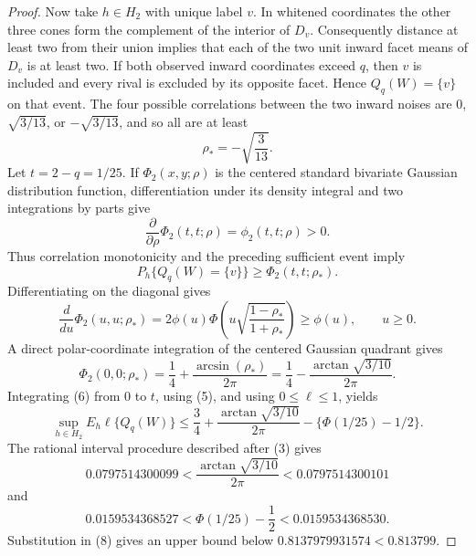 \documentclass{article}
\begin{document}
\begin{proof}
Now take \(h\in H_2\) with unique label \(v\).  In whitened coordinates the
other three cones form the complement of the interior of \(D_v\).
Consequently distance at least two from their union implies that each of
the two unit inward facet means of \(D_v\) is at least two.  If both observed
inward coordinates exceed \(q\), then \(v\) is included and every rival is
excluded by its opposite facet.  Hence \(Q_q(W)=\{v\}\) on that event.
The four possible correlations between the two inward noises are \(0\),
\(\sqrt{3/13}\), or \(-\sqrt{3/13}\), and so all are at least
\[
 \rho_*=-\sqrt{\frac3{13}}.
\tag{4}
\]
Let \(t=2-q=1/25\).  If \(\Phi_2(x,y;\rho)\) is the centered standard
bivariate Gaussian distribution function, differentiation under its
density integral and two integrations by parts give
\[
 \frac{\partial}{\partial\rho}\Phi_2(t,t;\rho)
 =\phi_2(t,t;\rho)>0.
\]
Thus correlation monotonicity and the preceding sufficient event imply
\[
 P_h\{Q_q(W)=\{v\}\}\geq\Phi_2(t,t;\rho_*).
\tag{5}
\]
Differentiating on the diagonal gives
\[
 \frac d{du}\Phi_2(u,u;\rho_*)
 =2\phi(u)\Phi\left(
 u\sqrt{\frac{1-\rho_*}{1+\rho_*}}\right)
 \geq\phi(u),\qquad u\geq0.
\tag{6}
\]
A direct polar-coordinate integration of the centered Gaussian quadrant
gives
\[
 \Phi_2(0,0;\rho_*)
 =\frac14+\frac{\arcsin(\rho_*)}{2\pi}
 =\frac14-\frac{\arctan\sqrt{3/10}}{2\pi}.
\tag{7}
\]
Integrating (6) from \(0\) to \(t\), using (5), and using
\(0\leq\ell\leq1\), yields
\[
 \sup_{h\in H_2}E_h\ell\{Q_q(W)\}
 \leq
 \frac34+\frac{\arctan\sqrt{3/10}}{2\pi}
 -\{\Phi(1/25)-1/2\}.
\tag{8}
\]
The rational interval procedure described after (3) gives
\[
 0.0797514300099
 <\frac{\arctan\sqrt{3/10}}{2\pi}
 <0.0797514300101
\tag{9}
\]
and
\[
 0.0159534368527
 <\Phi(1/25)-\frac12
 <0.0159534368530.
\tag{10}
\]
Substitution in (8) gives an upper bound below
\(0.8137979931574<0.813799\).


\end{proof}
\end{document}
